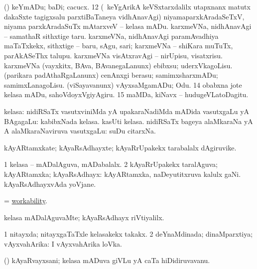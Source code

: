  (\AmA) keYmADu; baDi; cacucx. 
\eanum
\numie
\num{12}  (\kanmu\ keYgArikA keVSxtarxdalilx utapxnanx matutx dakaSxte tagigxsalu parxtiBaTaneya vidhAnavAgi) niyamaparxkAradaSeTxV, niyama parxkAradaSuTx mAtarxveV -- kelasa mADu. 
  
\banum
{} karxmeVNa, nidhAnavAgi -- samathaR sithxtige taru. 
 karxmeVNa, nidhAnavAgi paramAvadhiya maTaTxkekx, sithxtige -- baru, sAgu, sari; karxmeVNa -- shiKara muTuTx, parAkASeThx talupu. 
 karxmeVNa visAtxravAgi -- nirUpisu, visatxrisu. 
 karxmeVNa (vayxkitx, BAva, BAvanegaLanunx) ebibxsu; uderxVkagoLisu. 
 (parikara padAthaRgaLanunx) cenAnxgi berasu; samimxsharxmADu; samimxLanagoLisu. 
 (viSayavanunx) vAyxsaMgamADu; Odu. 
\eanum
\numie
\num{14}  obabxna jote kelasa mADu, sahoVdoyxVgiyAgiru. 
\num{15}  maMDa, kiNavx -- hudugeVLatoDagitu. 
\enum
\emng
\eentry

\bentry
{}
\gl{\saupa}
\expl{}
\bmng
kelasa: 
\banum
{} nidiRSaTx vasutxviniMda yA upakaraNadiMda mADida vasutxgaLu yA BAgagaLu:  kabibxNada kelasa.  kasUti kelasa. 
 nidiRSaTx bageya alaMkaraNa yA A alaMkaraNaviruva vasutxgaLu:  suDu citarxNa. 
\eanum
\emng
\eentry

\bentry
{} 
\gl{\nA}
\bmng
kAyARtamxkate; kAyaRsAdhayxte; kAyaRrUpakekx tarabalalx dAgiruvike. 
\emng
\eentry

\bentry
{} 
\gl{\gu}
\expl{}
\bmng
\bnum
\num{1} kelasa -- mADalAguva, mADabalalx. 
\num{2} kAyaRrUpakekx taralAguva; kAyARtamxka; kAyaRsAdhayx:  kAyARtamxka, naDeyutitxruva kalulx gaNi.  kAyaRsAdhayxvAda yoVjane. 
\enum
\emng
\eentry

\bentry
{} 
\gl{\nA}
\expl{}
\bmng
= \hyperlink{workability}{workability}. 
\emng
\eentry

\bentry
{} 
\gl{\kirxvi}
\expl{}
\bmng
kelasa mADalAguvaMte; kAyaRsAdhayx riVtiyalilx. 
\emng
\eentry

\bentry
{} 
\gl{\gu}
\expl{}
\bmng
\bnum
\num{1} nitayxda; nitayxgaTaTxle kelasakekx takakx. 
\num{2} deYnaMdinada; dinaMparxtiya; vAyxvahArika:  I vAyxvahArika loVka. 
\enum
\emng
\eentry

\bentry
{} 
\gl{\nA}
\expl{}
\bmng
(\AmA) kAyaRvayxsani; kelasa mADuva giVLu yA caTa hiDidiruvavanu. 
\emng
\eentry

